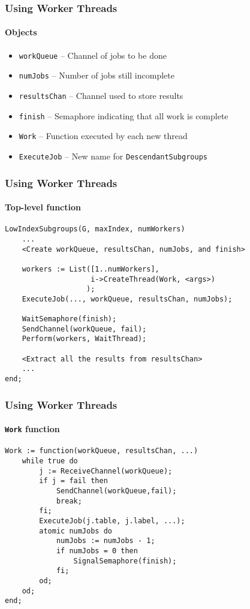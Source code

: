 \documentclass{beamer}
\begin{document}
\begin{frame}
  \frametitle{Using Worker Threads}
  \framesubtitle{Objects} \pause
  \begin{itemize}
  \item \texttt{workQueue} -- Channel of jobs to be done \pause
  \item \texttt{numJobs} -- Number of jobs still incomplete \pause
  \item \texttt{resultsChan} -- Channel used to store results \pause
  \item \texttt{finish} -- Semaphore indicating that all work is complete \pause
  \item \texttt{Work} -- Function executed by each new thread \pause
  \item \texttt{ExecuteJob} -- New name for \texttt{DescendantSubgroups}
  \end{itemize}
\end{frame}

\begin{frame}[fragile]
  \frametitle{Using Worker Threads}
  \framesubtitle{Top-level function}
\begin{verbatim}
LowIndexSubgroups(G, maxIndex, numWorkers)
    ...
    <Create workQueue, resultsChan, numJobs, and finish>

    workers := List([1..numWorkers],
                    i->CreateThread(Work, <args>)
                   );
    ExecuteJob(..., workQueue, resultsChan, numJobs);

    WaitSemaphore(finish);
    SendChannel(workQueue, fail);
    Perform(workers, WaitThread);

    <Extract all the results from resultsChan>
    ...
end;
\end{verbatim}
\end{frame}

\begin{frame}[fragile]
  \frametitle{Using Worker Threads}
  \framesubtitle{\texttt{Work} function}
\begin{verbatim}
Work := function(workQueue, resultsChan, ...)
    while true do
        j := ReceiveChannel(workQueue);
        if j = fail then
            SendChannel(workQueue,fail);
            break;
        fi;
        ExecuteJob(j.table, j.label, ...);
        atomic numJobs do
            numJobs := numJobs - 1;
            if numJobs = 0 then
                SignalSemaphore(finish);
            fi;
        od;
    od;
end;
\end{verbatim}
\end{frame}
\end{document}
